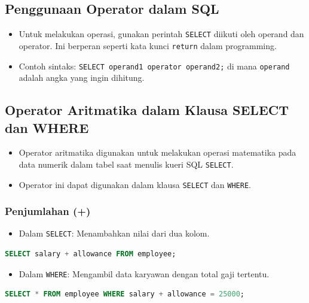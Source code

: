 \documentclass{article}
\begin{document}
\subsection{Penggunaan Operator dalam SQL}
\begin{itemize}
    \item Untuk melakukan operasi, gunakan perintah \texttt{SELECT} diikuti oleh operand dan operator. Ini berperan seperti kata kunci \texttt{return} dalam programming.
    \item Contoh sintaks: \texttt{SELECT operand1 operator operand2;} di mana \texttt{operand} adalah angka yang ingin dihitung.
\end{itemize}

\subsection{Operator Aritmatika dalam Klausa SELECT dan WHERE}
\begin{itemize}
    \item Operator aritmatika digunakan untuk melakukan operasi matematika pada data numerik dalam tabel saat menulis kueri SQL \texttt{SELECT}.
    \item Operator ini dapat digunakan dalam klausa \texttt{SELECT} dan \texttt{WHERE}.
\end{itemize}

\subsubsection{Penjumlahan (+)}
\begin{itemize}
    \item Dalam \texttt{SELECT}: Menambahkan nilai dari dua kolom.
\end{itemize}
\begin{lstlisting}[language=SQL, caption={Penjumlahan dalam SELECT}, captionpos=b]
SELECT salary + allowance FROM employee;
\end{lstlisting}
\begin{itemize}
    \item Dalam \texttt{WHERE}: Mengambil data karyawan dengan total gaji tertentu.
\end{itemize}
\begin{lstlisting}[language=SQL, caption={Penjumlahan dalam WHERE}, captionpos=b]
SELECT * FROM employee WHERE salary + allowance = 25000;
\end{lstlisting}
\end{document}

